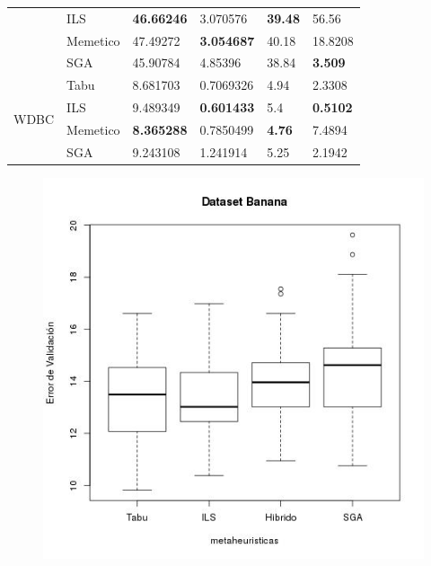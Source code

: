 \documentclass[11pt]{article}
\begin{document}
\begin{table}[h]
{\begin{tabular}{ |l|l|l|l|l|l| }
                              & ILS      & \bf{46.66246}   & 3.070576     & \bf{39.48}   & 56.56 \\
                              & Memetico & 47.49272   & \bf{3.054687}     & 40.18   & 18.8208 \\
                              & SGA      & 45.90784   & 4.85396      & 38.84   & \bf{3.509}\\ \hline
    \multirow{4}{*}{WDBC} & Tabu     & 8.681703   & 0.7069326    & 4.94    & 2.3308 \\
                          & ILS      & 9.489349   & \bf{0.601433}     & 5.4     & \bf{0.5102} \\
                          & Memetico & \bf{8.365288}   & 0.7850499    & \bf{4.76}    & 7.4894 \\
                          & SGA      & 9.243108   & 1.241914     & 5.25    & 2.1942\\ \hline
\end{tabular}
}
\end{table}

\clearpage
\newpage

\begin{figure}[h!]
\begin{center}
  \includegraphics[scale=0.4]{banana_error_val.jpeg}~\\[1cm]
\end{center}
\end{figure}
\end{document}
